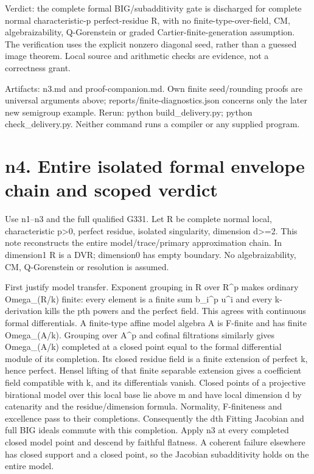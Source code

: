 \documentclass[11pt]{article}
\begin{document}
Verdict: the complete formal BIG/subadditivity gate is discharged for complete normal characteristic-p perfect-residue R, with no finite-type-over-field, CM, algebraizability, Q-Gorenstein or graded Cartier-finite-generation assumption. The verification uses the explicit nonzero diagonal seed, rather than a guessed image theorem. Local source and arithmetic checks are evidence, not a correctness grant.

Artifacts: n3.md and proof-companion.md. Own finite seed/rounding proofs are universal arguments above; reports/finite-diagnostics.json concerns only the later new semigroup example. Rerun: python build\_delivery.py; python check\_delivery.py. Neither command runs a compiler or any supplied program.

\section{n4. Entire isolated formal envelope chain and scoped verdict}

Use n1--n3 and the full qualified G331. Let R be complete normal local, characteristic p>0, perfect residue, isolated singularity, dimension d>=2. This note reconstructs the entire model/trace/primary approximation chain. In dimension1 R is a DVR; dimension0 has empty boundary. No algebraizability, CM, Q-Gorenstein or resolution is assumed.

First justify model transfer. Exponent grouping in R over R\textasciicircum{}p makes ordinary Omega\_(R/k) finite: every element is a finite sum b\_i\textasciicircum{}p u\textasciicircum{}i and every k-derivation kills the pth powers and the perfect field. This agrees with continuous formal differentials. A finite-type affine model algebra A is F-finite and has finite Omega\_(A/k). Grouping over A\textasciicircum{}p and cofinal filtrations similarly gives Omega\_(A/k) completed at a closed point equal to the formal differential module of its completion. Its closed residue field is a finite extension of perfect k, hence perfect. Hensel lifting of that finite separable extension gives a coefficient field compatible with k, and its differentials vanish. Closed points of a projective birational model over this local base lie above m and have local dimension d by catenarity and the residue/dimension formula. Normality, F-finiteness and excellence pass to their completions. Consequently the dth Fitting Jacobian and full BIG ideals commute with this completion. Apply n3 at every completed closed model point and descend by faithful flatness. A coherent failure elsewhere has closed support and a closed point, so the Jacobian subadditivity holds on the entire model.
\end{document}

